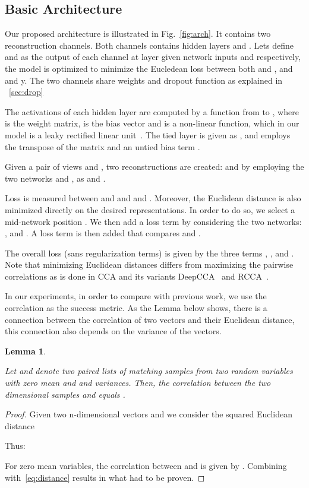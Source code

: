\documentclass[10pt,twocolumn,letterpaper]{article}
\newtheorem{lemma}{Lemma}
\begin{document}
\subsection{Basic Architecture}
Our proposed architecture is illustrated in Fig.~\ref{fig:arch}. It contains two reconstruction channels. Both channels contains  hidden layers  and . Lets define  and  as the output of each channel at layer  given network inputs  and  respectively, the model is optimized to minimize the Eucledean loss between both  and , and  and y. The two channels share weights and dropout function as explained in ~\ref{sec:drop}

The activations of each hidden layer are computed by a function  from  to , where  is the weight matrix,  is the bias vector and  is a non-linear function, which in our model is a leaky rectified linear unit~\cite{relu2}. The tied layer is given as , and employs the transpose of the matrix  and an untied bias term . 

Given a pair of views  and , two reconstructions are created:  and  by employing the two networks  and , as  and . 

Loss is measured between  and  and  and . Moreover, the Euclidean distance is also minimized directly on the desired representations. In order to do so, we select a mid-network position . We then add a loss term by considering the two networks: , and . A loss term is then added that compares  and .

The overall loss (sans regularization terms) is given by the three terms , , and . Note that minimizing Euclidean distances differs from maximizing the pairwise correlations as is done in CCA and its variants DeepCCA~\cite{deepcca} and RCCA~\cite{rcca}. 

In our experiments, in order to compare with previous work, we use the correlation as the success metric. As the Lemma below shows, there is a connection between the correlation of two vectors and their Euclidean distance, this connection also depends on the variance of the vectors.  

\begin{lemma}\label{lemma:Euclidean}

Let  and  denote two paired lists of  matching samples from two random variables with zero mean and  and  variances. Then, the correlation between the two  dimensional samples  and  equals .

\end{lemma}
\begin{proof}
Given two n-dimensional vectors  and  we consider the squared Euclidean distance 

Thus: 

For zero mean variables, the correlation between  and  is given by . 
Combining with~\ref{eq:distance} results in what had to be proven.
\end{proof}
\end{document}
